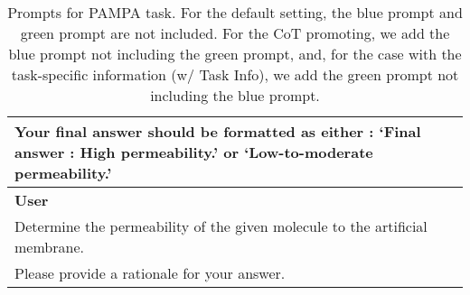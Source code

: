 \begin{table*}[ht!]
\begin{tcolorbox}
\begin{tabular}{p{.95\linewidth}}
        Your final answer should be formatted as either : `Final answer : High permeability.' or `Low-to-moderate permeability.' \\
        \midrule
        \textbf{User} \\
        Determine the permeability of the given molecule to the artificial membrane.\\
        \textcolor{figblue}{Please provide a rationale for your answer.}
    \end{tabular}
\end{tcolorbox}
\vspace{-0.1in}
\caption{Prompts for PAMPA task. For the default setting, the \textcolor{figblue}{blue prompt} and \textcolor{figgreen}{green prompt} are not included. For the CoT promoting, we add the \textcolor{figblue}{blue prompt} not including the green prompt, and, for the case with the task-specific information (w/ Task Info), we add the \textcolor{figgreen}{green prompt} not including the blue prompt.}
\label{app:tab:prompts_pampa_infer}
\end{table*}
